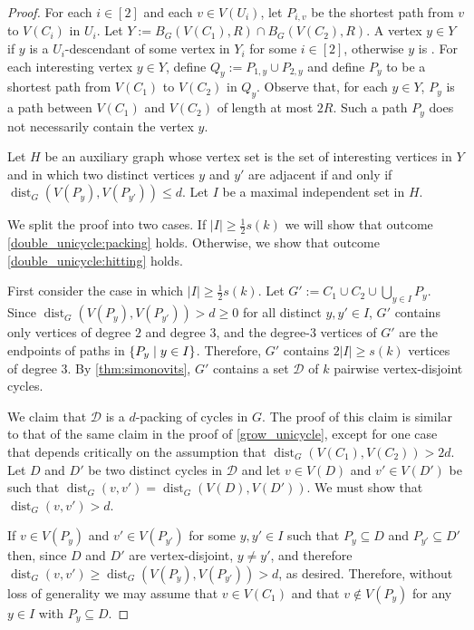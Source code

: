 \documentclass{patmorin}
\DeclareMathOperator{\dist}{dist}
\DeclarePairedDelimiter\set{\{}{\}}
\begin{document}
\begin{proof}
    For each $i\in[2]$ and each $v\in V(U_i)$, let $P_{i,v}$ be the shortest path from $v$ to $V(C_i)$ in $U_i$.     Let $Y:=B_G(V(C_1),R)\cap B_G(V(C_2),R)$. A vertex $y\in Y$  if $y$ is a $U_i$-descendant of some vertex in $Y_i$ for some $i\in[2]$,  otherwise $y$ is .  For each interesting vertex $y\in Y$, define $Q_y:= P_{1,y}\cup P_{2,y}$ and define $P_y$ to be a shortest path from $V(C_1)$ to $V(C_2)$ in $Q_y$.  Observe that, for each $y\in Y$, $P_y$ is a path between $V(C_1)$ and $V(C_2)$ of length at most $2R$.  Such a path $P_y$ does not necessarily contain the vertex $y$. 

    Let $H$ be an auxiliary graph whose vertex set is the set of interesting vertices in $Y$ and in which two distinct vertices $y$ and $y'$ are adjacent if and only if $\dist_G(V(P_y),V(P_{y'}))\leq d$.
    Let $I$ be a maximal independent set in $H$.

    We split the proof into two cases.  If 
    $|I|\geq \frac{1}{2}s(k)$ we will show that outcome \cref{double_unicycle:packing} holds.  Otherwise, we show that outcome \cref{double_unicycle:hitting} holds.

    First consider the case in which $|I|\ge\tfrac{1}{2}s(k)$.
    Let $G':=C_1\cup C_2\cup\bigcup_{y\in I}P_y$.
    Since $\dist_G(V(P_y),V(P_{y'}))>d\ge 0$ for all distinct $y,y'\in I$, $G'$ contains only vertices of degree $2$ and degree $3$, and the degree-$3$ vertices of $G'$ are the endpoints of paths in $\set{P_y\mid y\in I}$.
    Therefore, $G'$ contains $2|I|\geq s(k)$ vertices of degree $3$.
    By \cref{thm:simonovits}, $G'$ contains a set $\mathcal{D}$ of $k$ pairwise vertex-disjoint cycles.

    We claim that $\mathcal{D}$ is a $d$-packing of cycles in $G$. The proof of this claim is similar to that of the same claim in the proof of \cref{grow_unicycle}, except for one case that depends critically on the assumption that $\dist_G(V(C_1),V(C_2))>2d$.  Let $D$ and $D'$ be two distinct cycles in $\mathcal{D}$ and let $v\in V(D)$ and $v'\in V(D')$ be such that $\dist_G(v,v')=\dist_G(V(D),V(D'))$.  We must show that $\dist_G(v,v')>d$.


    If $v\in V(P_y)$ and $v'\in V(P_{y'})$ for some  $y,y' \in I$ such that $P_y\subseteq D$ and $P_{y'}\subseteq D'$ then, 
    since $D$ and $D'$ are vertex-disjoint, $y\neq y'$, and therefore 
    $\dist_G(v,v')\geq  \dist_G(V(P_y),V(P_{y'}))>d$, as desired.  Therefore, without loss of generality we may assume that $v\in V(C_1)$ and that $v\notin V(P_y)$ for any $y\in I$ with $P_y\subseteq D$.


\end{proof}
\end{document}

